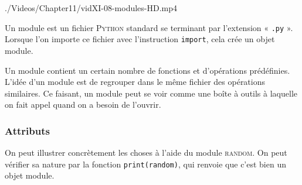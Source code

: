 \begin{marginvideo}
		{./Videos/Chapter11/vidXI-08-modules-HD.mp4}%
\end{marginvideo}

Un module est un fichier \textsc{Python} standard se terminant par l'extension « \texttt{.py} ». Lorsque l'on importe ce fichier avec l'instruction \texttt{import}, cela crée un objet module.

Un module contient un certain nombre de fonctions et d'opérations prédéfinies. L'idée d'un module est de regrouper dans le même fichier des opérations similaires. Ce faisant, un module peut se voir comme une boîte à outils à laquelle on fait appel quand on a besoin de l'ouvrir.

\subsubsection[Attributs]{Attributs}
\label{subsub:XI.4.2.1}

On peut illustrer concrètement les choses à l'aide du module \textsc{random}. On peut vérifier sa nature par la fonction \texttt{print(random)}, qui renvoie que c'est bien un objet module.

